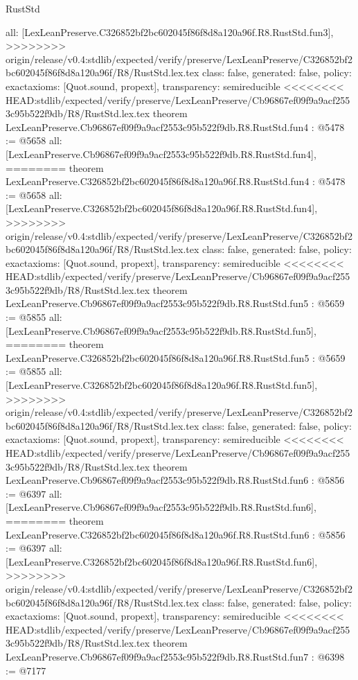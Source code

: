 \begin{lexlean}{RustStd}
\begin{coremodule}
{\begin{coremodule}
{{{{{{{  all: [LexLeanPreserve.C326852bf2bc602045f86f8d8a120a96f.R8.RustStd.fun3],
>>>>>>>> origin/release/v0.4:stdlib/expected/verify/preserve/LexLeanPreserve/C326852bf2bc602045f86f8d8a120a96f/R8/RustStd.lex.tex
  class: false,
  generated: false,
  policy: exact{axioms: [Quot.sound, propext]},
  transparency: semireducible
}
<<<<<<<< HEAD:stdlib/expected/verify/preserve/LexLeanPreserve/Cb96867ef09f9a9acf2553c95b522f9db/R8/RustStd.lex.tex
theorem LexLeanPreserve.Cb96867ef09f9a9acf2553c95b522f9db.R8.RustStd.fun4 : @5478 := @5658 {
  all: [LexLeanPreserve.Cb96867ef09f9a9acf2553c95b522f9db.R8.RustStd.fun4],
========
theorem LexLeanPreserve.C326852bf2bc602045f86f8d8a120a96f.R8.RustStd.fun4 : @5478 := @5658 {
  all: [LexLeanPreserve.C326852bf2bc602045f86f8d8a120a96f.R8.RustStd.fun4],
>>>>>>>> origin/release/v0.4:stdlib/expected/verify/preserve/LexLeanPreserve/C326852bf2bc602045f86f8d8a120a96f/R8/RustStd.lex.tex
  class: false,
  generated: false,
  policy: exact{axioms: [Quot.sound, propext]},
  transparency: semireducible
}
<<<<<<<< HEAD:stdlib/expected/verify/preserve/LexLeanPreserve/Cb96867ef09f9a9acf2553c95b522f9db/R8/RustStd.lex.tex
theorem LexLeanPreserve.Cb96867ef09f9a9acf2553c95b522f9db.R8.RustStd.fun5 : @5659 := @5855 {
  all: [LexLeanPreserve.Cb96867ef09f9a9acf2553c95b522f9db.R8.RustStd.fun5],
========
theorem LexLeanPreserve.C326852bf2bc602045f86f8d8a120a96f.R8.RustStd.fun5 : @5659 := @5855 {
  all: [LexLeanPreserve.C326852bf2bc602045f86f8d8a120a96f.R8.RustStd.fun5],
>>>>>>>> origin/release/v0.4:stdlib/expected/verify/preserve/LexLeanPreserve/C326852bf2bc602045f86f8d8a120a96f/R8/RustStd.lex.tex
  class: false,
  generated: false,
  policy: exact{axioms: [Quot.sound, propext]},
  transparency: semireducible
}
<<<<<<<< HEAD:stdlib/expected/verify/preserve/LexLeanPreserve/Cb96867ef09f9a9acf2553c95b522f9db/R8/RustStd.lex.tex
theorem LexLeanPreserve.Cb96867ef09f9a9acf2553c95b522f9db.R8.RustStd.fun6 : @5856 := @6397 {
  all: [LexLeanPreserve.Cb96867ef09f9a9acf2553c95b522f9db.R8.RustStd.fun6],
========
theorem LexLeanPreserve.C326852bf2bc602045f86f8d8a120a96f.R8.RustStd.fun6 : @5856 := @6397 {
  all: [LexLeanPreserve.C326852bf2bc602045f86f8d8a120a96f.R8.RustStd.fun6],
>>>>>>>> origin/release/v0.4:stdlib/expected/verify/preserve/LexLeanPreserve/C326852bf2bc602045f86f8d8a120a96f/R8/RustStd.lex.tex
  class: false,
  generated: false,
  policy: exact{axioms: [Quot.sound, propext]},
  transparency: semireducible
}
<<<<<<<< HEAD:stdlib/expected/verify/preserve/LexLeanPreserve/Cb96867ef09f9a9acf2553c95b522f9db/R8/RustStd.lex.tex
theorem LexLeanPreserve.Cb96867ef09f9a9acf2553c95b522f9db.R8.RustStd.fun7 : @6398 := @7177 {
}}}}}}}}}}
\end{coremodule}}
\end{coremodule}
\end{lexlean}
